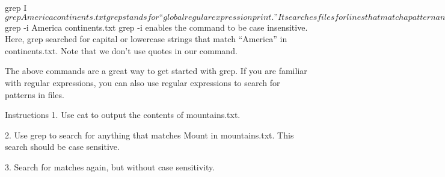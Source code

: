 grep I
        $ grep America continents.txt 
    grep stands for “global regular expression print.” It searches files for lines that match a pattern and then returns the results. It is also case sensitive. Above, grep searched for anything that matched “America” in continents.txt.

        $ grep -i America continents.txt
    grep -i enables the command to be case insensitive. Here, grep searched for capital or lowercase strings that match “America” in continents.txt. Note that we don’t use quotes in our command.

    The above commands are a great way to get started with grep. If you are familiar with regular expressions, you can also use regular expressions to search for patterns in files.

Instructions
    1.
    Use cat to output the contents of mountains.txt.

    2.
    Use grep to search for anything that matches Mount in mountains.txt. This search should be case sensitive.

    3.
    Search for matches again, but without case sensitivity.